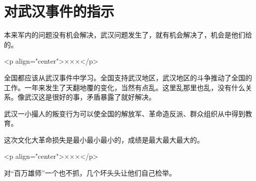 \section[对武汉事件的指示（一九六七年七月）]{对武汉事件的指示}


本来军内的问题没有机会解决，武汉问题发生了，就有机会解决了，机会是他们给的。

<p align="center">×××</p>

全国都应该从武汉事件中学习。全国支持武汉地区，武汉地区的斗争推动了全国的工作。一年来发生了天翻地覆的变化，当然有点乱。这里乱那里也乱，没有什么关系。像武汉这是很好的事，矛盾暴露了就好解决。

武汉一小撮人的叛变行为可以使全国的解放军、革命造反派、群众组织从中得到教育。

这次文化大革命损失是最小最小最小的，成绩是最大最大最大的。

<p align="center">×××</p>

对“百万雄师”一个也不抓，几个坏头头让他们自己检举。

